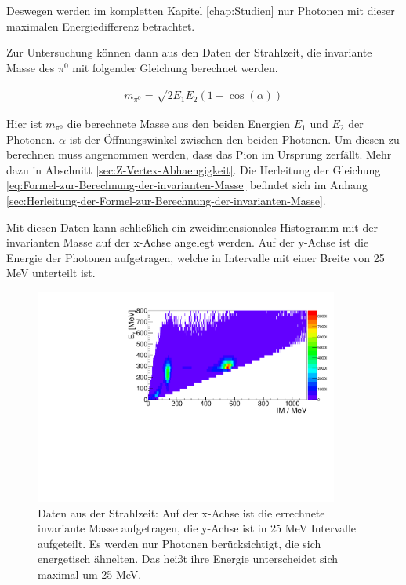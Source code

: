 \documentclass[a4paper,11pt,oneside,final,german,openbib,pdftex]{scrbook}
\begin{document}
{Deswegen werden im kompletten Kapitel \ref{chap:Studien} nur Photonen mit dieser maximalen Energiedifferenz betrachtet.

Zur Untersuchung k\"onnen dann aus den Daten der Strahlzeit, die invariante Masse des $\pi^0$ mit folgender Gleichung berechnet werden.

 \begin{equation}
 \begin{split}
 {m_{\pi^0}=\sqrt{2E_1E_2(1-\cos(\alpha))}}
 \label{eq:Formel-zur-Berechnung-der-invarianten-Masse}
 \end{split}
 \end{equation}

Hier ist $m_{\pi^0}$ die berechnete Masse aus den beiden Energien $E_1$ und $E_2$ der Photonen. $\alpha$ ist der \"Offnungswinkel zwischen den beiden Photonen. Um diesen zu berechnen muss angenommen werden, dass das Pion im Ursprung zerf\"allt. Mehr dazu in Abschnitt \ref{sec:Z-Vertex-Abhaengigkeit}.
Die Herleitung der Gleichung \ref{eq:Formel-zur-Berechnung-der-invarianten-Masse} befindet sich im Anhang \ref{sec:Herleitung-der-Formel-zur-Berechnung-der-invarianten-Masse}.

Mit diesen Daten kann schließlich ein zweidimensionales Histogramm mit der invarianten Masse auf der x-Achse angelegt werden. Auf der y-Achse ist die Energie der Photonen aufgetragen, welche in Intervalle mit einer Breite von 25 MeV unterteilt ist. 


\begin{figure}[h!]
	\begin{center}
		\includegraphics[width=100mm]{NewCalib/Strahlzeit2014/20171904Uncharged2DHist}
	
		\caption[Strahlzeit: 2D-Histogramm; Keine weiteren Bedingungen]{Daten aus der Strahlzeit: Auf der x-Achse ist die errechnete invariante Masse aufgetragen, die y-Achse ist in 25 MeV Intervalle aufgeteilt. Es werden nur Photonen ber\"ucksichtigt, die sich energetisch \"ahnelten. Das hei{\ss}t ihre Energie unterscheidet sich maximal um 25 MeV.}
			\label{fig:Energy-Interval-Hist-All-Bins}
	\end{center}
\end{figure}

}
\end{document}
